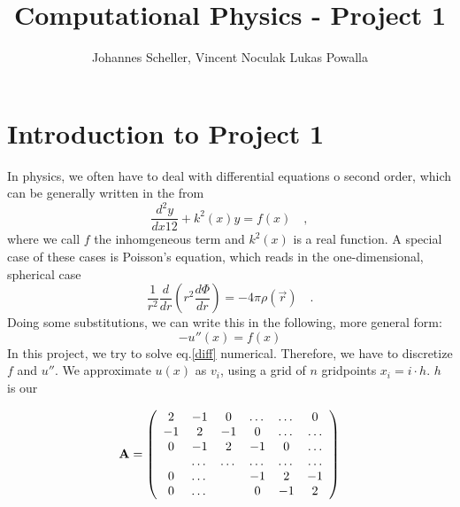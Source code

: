 \documentclass[10pt,a4paper]{article}
\author{Johannes Scheller, Vincent Noculak Lukas Powalla}
\title{Computational Physics - Project 1}
\begin{document}
\maketitle
\newpage
\tableofcontents
\newpage
\section{Introduction to Project 1}
In physics, we often have to deal with differential equations o second order, which can be generally written in the from
\begin{equation}
\frac{d^{2}y}{dx1{2}}+k^2(x)y=f(x)\quad,
\end{equation}
where we call $f$ the inhomgeneous term and $k^2(x)$ is a real function. A special case of these cases is Poisson's equation, which reads in the one-dimensional, spherical case
\begin{equation}
\frac{1}{r^2}\frac{d}{dr}\left(r^2\frac{d\Phi}{dr}\right)=-4\pi\rho\left(\vec{r}\right)\quad.
\end{equation}
Doing some substitutions, we can write this in the following, more general form:
\begin{equation}
\label{diff}
-u''(x)=f(x)
\end{equation}
In this project, we try to solve eq.\eqref{diff} numerical. Therefore, we have to discretize $f$ and $u''$. We approximate $u(x)$ as $v_i$, using a grid of $n$ gridpoints $x_i=i\cdot h$. $h$ is our

\begin{equation}
    {\bf A} = \left(\begin{array}{cccccc}
                           2& -1& 0 &\dots   & \dots &0 \\
                           -1 & 2 & -1 &0 &\dots &\dots \\
                           0&-1 &2 & -1 & 0 & \dots \\
                           & \dots   & \dots &\dots   &\dots & \dots \\
                           0&\dots   &  &-1 &2& -1 \\
                           0&\dots    &  & 0  &-1 & 2 \\
                      \end{array} \right)
\end{equation}
\end{document}
